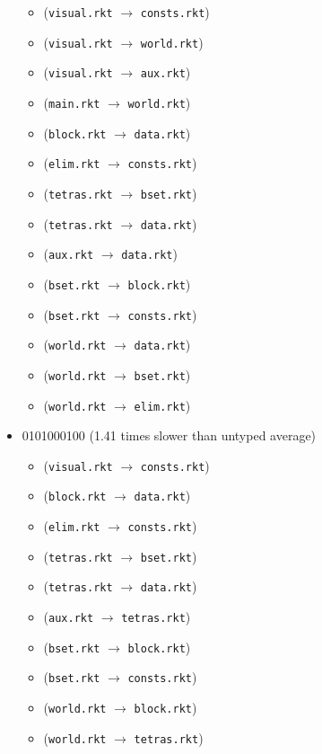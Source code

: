 \documentclass{article}
\newcommand{\mono}[1]{\texttt{#1}}
\begin{document}
\begin{itemize}
  \begin{itemize}
  \item (\mono{visual.rkt} $\rightarrow$ \mono{consts.rkt})
  \item (\mono{visual.rkt} $\rightarrow$ \mono{world.rkt})
  \item (\mono{visual.rkt} $\rightarrow$ \mono{aux.rkt})
  \item (\mono{main.rkt} $\rightarrow$ \mono{world.rkt})
  \item (\mono{block.rkt} $\rightarrow$ \mono{data.rkt})
  \item (\mono{elim.rkt} $\rightarrow$ \mono{consts.rkt})
  \item (\mono{tetras.rkt} $\rightarrow$ \mono{bset.rkt})
  \item (\mono{tetras.rkt} $\rightarrow$ \mono{data.rkt})
  \item (\mono{aux.rkt} $\rightarrow$ \mono{data.rkt})
  \item (\mono{bset.rkt} $\rightarrow$ \mono{block.rkt})
  \item (\mono{bset.rkt} $\rightarrow$ \mono{consts.rkt})
  \item (\mono{world.rkt} $\rightarrow$ \mono{data.rkt})
  \item (\mono{world.rkt} $\rightarrow$ \mono{bset.rkt})
  \item (\mono{world.rkt} $\rightarrow$ \mono{elim.rkt})
  \end{itemize}
\item 0101000100 (1.41 times slower than untyped average)
  \begin{itemize}
  \item (\mono{visual.rkt} $\rightarrow$ \mono{consts.rkt})
  \item (\mono{block.rkt} $\rightarrow$ \mono{data.rkt})
  \item (\mono{elim.rkt} $\rightarrow$ \mono{consts.rkt})
  \item (\mono{tetras.rkt} $\rightarrow$ \mono{bset.rkt})
  \item (\mono{tetras.rkt} $\rightarrow$ \mono{data.rkt})
  \item (\mono{aux.rkt} $\rightarrow$ \mono{tetras.rkt})
  \item (\mono{bset.rkt} $\rightarrow$ \mono{block.rkt})
  \item (\mono{bset.rkt} $\rightarrow$ \mono{consts.rkt})
  \item (\mono{world.rkt} $\rightarrow$ \mono{block.rkt})
  \item (\mono{world.rkt} $\rightarrow$ \mono{tetras.rkt})

\end{itemize}
\end{itemize}
\end{document}
